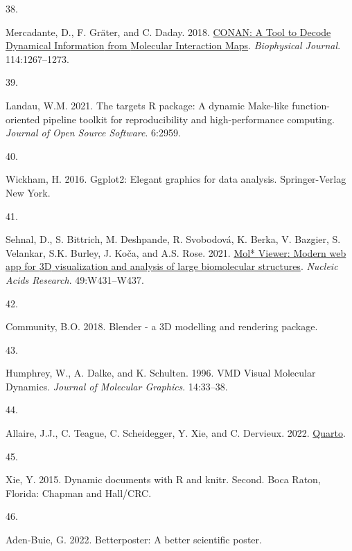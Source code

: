 \documentclass[
  twocolumn]{biophys-new-mod}
\newlength{\cslhangindent}
\newlength{\csllabelwidth}
\newlength{\cslentryspacingunit} %
\newenvironment{CSLReferences}[2] %
 {%
  \setlength{\parindent}{0pt}
  \ifodd #1
  \let\oldpar\par
  \def\par{\hangindent=\cslhangindent\oldpar}
  \fi
  \setlength{\parskip}{#2\cslentryspacingunit}
 }%
 {}
\newcommand{\CSLLeftMargin}[1]{\parbox[t]{\csllabelwidth}{#1}}
\newcommand{\CSLRightInline}[1]{\parbox[t]{\linewidth - \csllabelwidth}{#1}\break}
\begin{document}
\begin{CSLReferences}{0}{0}
\leavevmode{}%
\CSLLeftMargin{38. }%
\CSLRightInline{Mercadante, D., F. Gräter, and C. Daday. 2018.
\href{https://doi.org/10.1016/j.bpj.2018.01.033}{{CONAN}: {A Tool} to
{Decode Dynamical Information} from {Molecular Interaction Maps}}.
\emph{Biophysical Journal}. 114:1267--1273.}

\leavevmode{}%
\CSLLeftMargin{39. }%
\CSLRightInline{Landau, W.M. 2021. The targets {R} package: A dynamic
{Make-like} function-oriented pipeline toolkit for reproducibility and
high-performance computing. \emph{Journal of Open Source Software}.
6:2959.}

\leavevmode{}%
\CSLLeftMargin{40. }%
\CSLRightInline{Wickham, H. 2016. Ggplot2: {Elegant} graphics for data
analysis. {Springer-Verlag New York}.}

\leavevmode{}%
\CSLLeftMargin{41. }%
\CSLRightInline{Sehnal, D., S. Bittrich, M. Deshpande, R. Svobodová, K.
Berka, V. Bazgier, S. Velankar, S.K. Burley, J. Koča, and A.S. Rose.
2021. \href{https://doi.org/10.1093/nar/gkab314}{Mol* {Viewer}: Modern
web app for {3D} visualization and analysis of large biomolecular
structures}. \emph{Nucleic Acids Research}. 49:W431--W437.}

\leavevmode{}%
\CSLLeftMargin{42. }%
\CSLRightInline{Community, B.O. 2018. Blender - a {3D} modelling and
rendering package.}

\leavevmode{}%
\CSLLeftMargin{43. }%
\CSLRightInline{Humphrey, W., A. Dalke, and K. Schulten. 1996. {VMD}
\textendash{} {Visual Molecular Dynamics}. \emph{Journal of Molecular
Graphics}. 14:33--38.}

\leavevmode{}%
\CSLLeftMargin{44. }%
\CSLRightInline{Allaire, J.J., C. Teague, C. Scheidegger, Y. Xie, and C.
Dervieux. 2022. \href{https://doi.org/10.5281/zenodo.5960048}{Quarto}.}

\leavevmode{}%
\CSLLeftMargin{45. }%
\CSLRightInline{Xie, Y. 2015. Dynamic documents with {R} and knitr.
Second. {Boca Raton, Florida}: {Chapman and Hall/CRC}.}

\leavevmode{}%
\CSLLeftMargin{46. }%
\CSLRightInline{Aden-Buie, G. 2022. Betterposter: {A} better scientific
poster.}


\end{CSLReferences}
\end{document}
